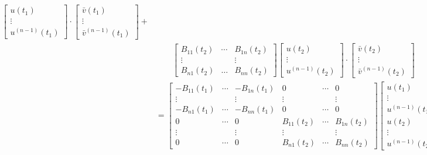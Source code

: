 \documentclass[11pt, oneside, a4paper]{article}
\begin{document}
\begin{equation}
\begin{split}
\begin{bmatrix}
    u(t_1)\\
    \vdots\\
    u^{(n-1)}(t_1)
    \end{bmatrix}\cdot 
    \begin{bmatrix}
        \bar{v}(t_1)\\
        \vdots\\
        \bar{v}^{(n-1)}(t_1)
    \end{bmatrix} + \\
    &\qquad \begin{bmatrix}
        B_{11}(t_2) & \cdots & B_{1n}(t_2)\\
        \vdots &  & \vdots\\
        B_{n1}(t_2) & \ldots & B_{nn}(t_2)
    \end{bmatrix} 
    \begin{bmatrix}
    u(t_2)\\
    \vdots\\
    u^{(n-1)}(t_2)
    \end{bmatrix}\cdot 
    \begin{bmatrix}
        \bar{v}(t_2)\\
        \vdots\\
        \bar{v}^{(n-1)}(t_2)
    \end{bmatrix}\\
    &= \begin{bmatrix}
        -B_{11}(t_1) & \cdots & -B_{1n}(t_1) & 0 & \cdots & 0\\
        \vdots &  & \vdots & \vdots &  & \vdots\\
        -B_{n1}(t_1) & \cdots & -B_{nn}(t_1) & 0 & \cdots & 0\\
        0 & \cdots & 0 & B_{11}(t_2) & \cdots & B_{1n}(t_2)\\
        \vdots &  & \vdots & \vdots &  & \vdots\\
        0 & \cdots & 0 & B_{n1}(t_2) & \cdots & B_{nn}(t_2)
    \end{bmatrix} 
    \begin{bmatrix}
        u(t_1)\\
        \vdots\\
        u^{(n-1)}(t_1)\\
        u(t_2)\\
        \vdots\\
        u^{(n-1)}(t_2)
    \end{bmatrix}\cdot
    \begin{bmatrix}
        \bar{v}(t_1)\\

\end{bmatrix}
\end{split}
\end{equation}
\end{document}
